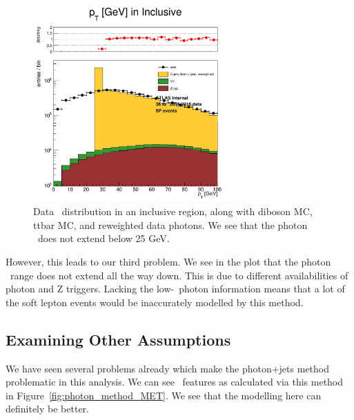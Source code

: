 \begin{figure}[hbtp]
    \centering
    \includegraphics[width=0.7\textwidth]{Images/SUSY/ptll_distributions.pdf}
    \caption{Data \pt\ distribution in an inclusive region, along with diboson MC, ttbar MC, and reweighted data photons. We see that the photon \pt\ does not extend below 25 GeV.}
    \label{fig:reweighting}
\end{figure}

However, this leads to our third problem. We see in the plot that the photon \pt\ range does not extend all the way down. This is due to different availabilities of photon and Z triggers. Lacking the low-\pt\ photon information means that a lot of the soft lepton events would be inaccurately modelled by this method.

\subsection*{Examining Other Assumptions}

We have seen several problems already which make the photon+jets method problematic in this analysis. We can see \MET\ features as calculated via this method in Figure~\ref{fig:photon_method_MET}. We see that the modelling here can definitely be better.

